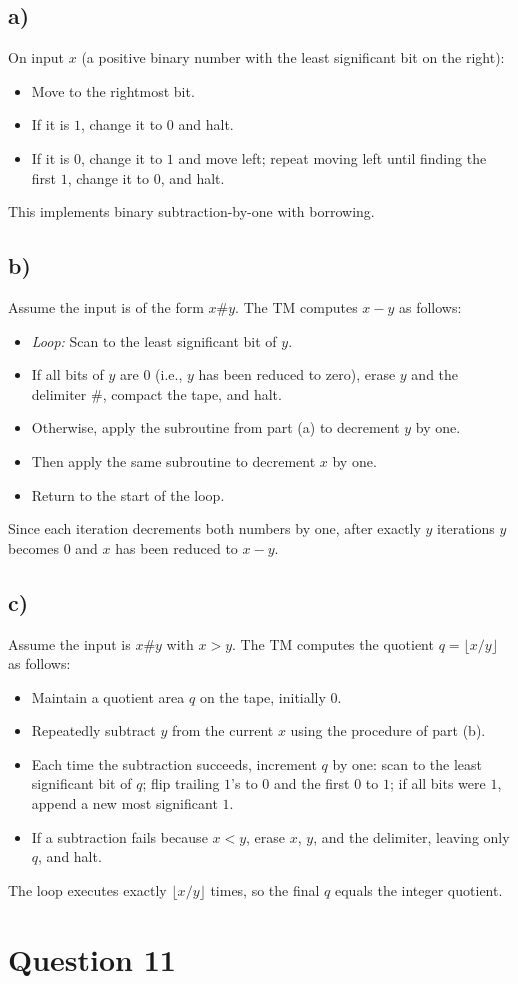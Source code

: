 \documentclass[a4paper, UTF-8]{article}
\theoremstyle{plain}
\begin{document}
\subsection{a)}

On input $x$ (a positive binary number with the least significant bit on the right):
\begin{itemize}
    \item Move to the rightmost bit.
    \item If it is $1$, change it to $0$ and halt.
    \item If it is $0$, change it to $1$ and move left; repeat moving left until finding the first $1$, change it to $0$, and halt.
\end{itemize}
This implements binary subtraction-by-one with borrowing.

\subsection{b)}

Assume the input is of the form $x \# y$. The TM computes $x - y$ as follows:
\begin{itemize}
    \item \emph{Loop:} Scan to the least significant bit of $y$.
    \item If all bits of $y$ are $0$ (i.e., $y$ has been reduced to zero), erase $y$ and the delimiter $\#$, compact the tape, and halt.
    \item Otherwise, apply the subroutine from part (a) to decrement $y$ by one.
    \item Then apply the same subroutine to decrement $x$ by one.
    \item Return to the start of the loop.
\end{itemize}
Since each iteration decrements both numbers by one, after exactly $y$ iterations $y$ becomes $0$ and $x$ has been reduced to $x - y$.

\subsection{c)}

Assume the input is $x \# y$ with $x > y$. The TM computes the quotient $q = \lfloor x / y \rfloor$ as follows:
\begin{itemize}
    \item Maintain a quotient area $q$ on the tape, initially $0$.
    \item Repeatedly subtract $y$ from the current $x$ using the procedure of part (b).
    \item Each time the subtraction succeeds, increment $q$ by one: scan to the least significant bit of $q$; flip trailing $1$'s to $0$ and the first $0$ to $1$; if all bits were $1$, append a new most significant $1$.
    \item If a subtraction fails because $x < y$, erase $x$, $y$, and the delimiter, leaving only $q$, and halt.
\end{itemize}
The loop executes exactly $\lfloor x / y \rfloor$ times, so the final $q$ equals the integer quotient.

\section{Question 11} 
\end{document}
